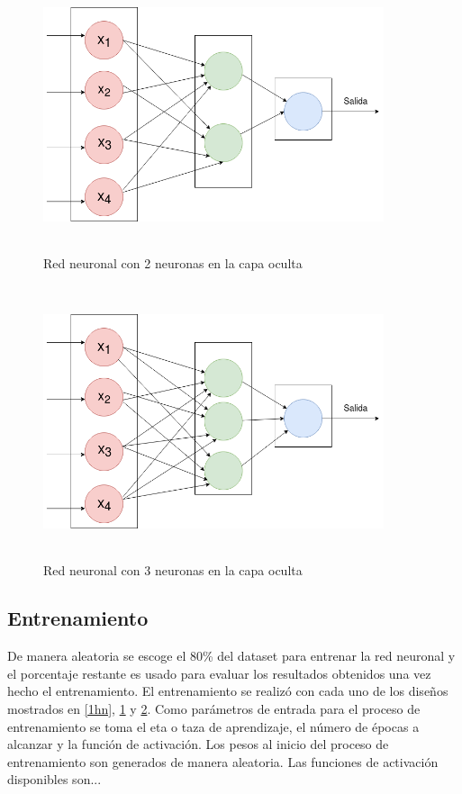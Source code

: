 \documentclass[11pt]{article}
\begin{document}
\begin{figure}[h]
    \includegraphics[width=10cm, height=8cm]{2hn}
    \centering
    \caption{Red neuronal con 2 neuronas en la capa oculta}
    \label{2hn}
\end{figure}
\begin{figure}[h]
    \includegraphics[width=10cm, height=8cm]{3hn}
    \centering
    \caption{Red neuronal con 3 neuronas en la capa oculta}
    \label{3hn}
\end{figure}
\subsection{Entrenamiento}
De manera aleatoria se escoge  el 80\% del dataset para entrenar la red neuronal y el porcentaje
restante es usado para evaluar los resultados obtenidos una vez hecho el entrenamiento.
El entrenamiento se realiz\'o con cada uno de los dise\~nos mostrados en \ref{1hn}, \ref{2hn} y \ref{3hn}.
Como par\'ametros de entrada para el proceso de entrenamiento se toma el eta o taza de aprendizaje, el n\'umero de \'epocas a alcanzar y la funci\'on de activaci\'on.
Los pesos al inicio del proceso de entrenamiento son generados de manera aleatoria. Las funciones de activaci\'on disponibles son...
\end{document}
